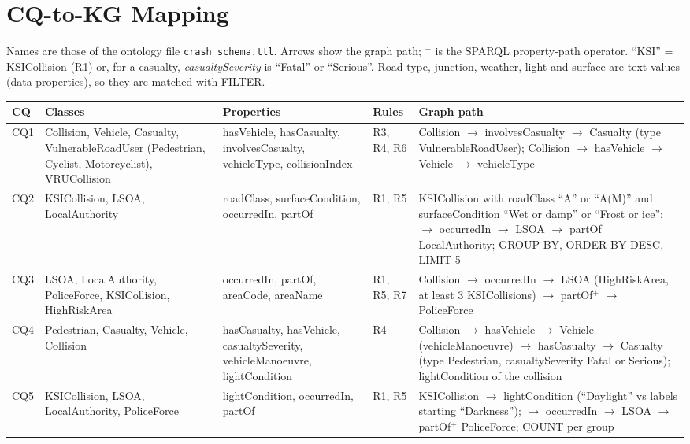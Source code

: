 \documentclass[11pt,a4paper]{article}
\newcommand{\cls}[1]{\textsf{#1}}
\begin{document}
\section{CQ-to-KG Mapping}
Names are those of the ontology file \texttt{crash\_schema.ttl}. Arrows show the graph path; $^{+}$ is the SPARQL property-path operator. ``KSI'' = \cls{KSICollision} (R1) or, for a casualty, \textit{casualtySeverity} is ``Fatal'' or ``Serious''. Road type, junction, weather, light and surface are text values (data properties), so they are matched with FILTER.
\footnotesize
\begin{longtable}{L{0.8cm} L{3.3cm} L{3.9cm} L{1.7cm} L{5.8cm}}
\toprule
\textbf{CQ} & \textbf{Classes} & \textbf{Properties} & \textbf{Rules} & \textbf{Graph path}\\
\midrule
\endhead
CQ1 & Collision, Vehicle, Casualty, VulnerableRoadUser (Pedestrian, Cyclist, Motorcyclist), VRUCollision & hasVehicle, hasCasualty, involvesCasualty, vehicleType, collisionIndex & R3, R4, R6 & Collision $\rightarrow$ involvesCasualty $\rightarrow$ Casualty (type VulnerableRoadUser); Collision $\rightarrow$ hasVehicle $\rightarrow$ Vehicle $\rightarrow$ vehicleType\\
CQ2 & KSICollision, LSOA, LocalAuthority & roadClass, surfaceCondition, occurredIn, partOf & R1, R5 & KSICollision with roadClass ``A'' or ``A(M)'' and surfaceCondition ``Wet or damp'' or ``Frost or ice''; $\rightarrow$ occurredIn $\rightarrow$ LSOA $\rightarrow$ partOf LocalAuthority; GROUP BY, ORDER BY DESC, LIMIT 5\\
CQ3 & LSOA, LocalAuthority, PoliceForce, KSICollision, HighRiskArea & occurredIn, partOf, areaCode, areaName & R1, R5, R7 & Collision $\rightarrow$ occurredIn $\rightarrow$ LSOA (HighRiskArea, at least 3 KSICollisions) $\rightarrow$ partOf$^{+}$ $\rightarrow$ PoliceForce\\
CQ4 & Pedestrian, Casualty, Vehicle, Collision & hasCasualty, hasVehicle, casualtySeverity, vehicleManoeuvre, lightCondition & R4 & Collision $\rightarrow$ hasVehicle $\rightarrow$ Vehicle (vehicleManoeuvre) $\rightarrow$ hasCasualty $\rightarrow$ Casualty (type Pedestrian, casualtySeverity Fatal or Serious); lightCondition of the collision\\
CQ5 & KSICollision, LSOA, LocalAuthority, PoliceForce & lightCondition, occurredIn, partOf & R1, R5 & KSICollision $\rightarrow$ lightCondition (``Daylight'' vs labels starting ``Darkness''); $\rightarrow$ occurredIn $\rightarrow$ LSOA $\rightarrow$ partOf$^{+}$ PoliceForce; COUNT per group\\

\end{longtable}
\end{document}
